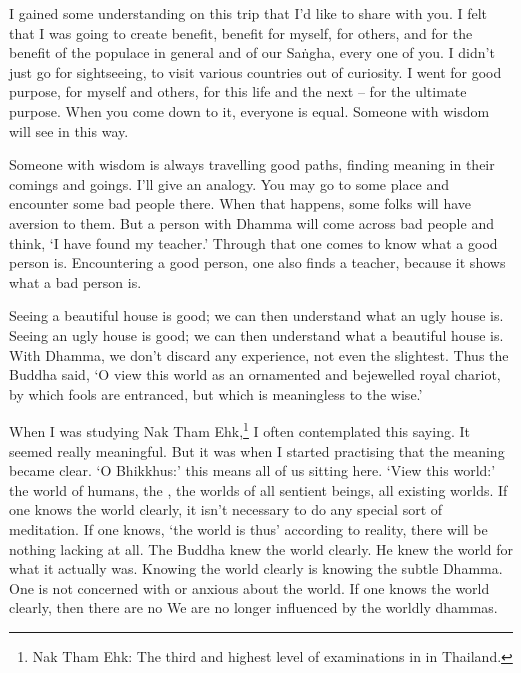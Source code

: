 I gained some understanding on this trip that I'd like to share with you. I felt that I was going to create benefit, benefit for myself, for others, and for the  benefit of the populace in general and of our Sa\.ngha, every one of you. I didn't just go for sightseeing, to visit various countries out of curiosity. I went for good purpose, for myself and others, for this life and the next -- for the ultimate purpose. When you come down to it, everyone is equal. Someone with wisdom will see in this way.

Someone with wisdom is always travelling good paths, finding meaning in their comings and goings. I'll give an analogy. You may go to some place and encounter some bad people there. When that happens, some folks will have aversion to them. But a person with Dhamma will come across bad people and think, `I have found my teacher.' Through that one comes to know what a good person is. Encountering a good person, one also finds a teacher, because it shows what a bad person is.

Seeing a beautiful house is good; we can then understand what an ugly house is. Seeing an ugly house is good; we can then understand what a beautiful house is. With Dhamma, we don't discard any experience, not even the slightest. Thus the Buddha said, `O  view this world as an ornamented and bejewelled royal chariot, by which fools are entranced, but which is meaningless to the wise.'

When I was studying Nak Tham Ehk,\footnote{Nak Tham Ehk: The third and highest level of examinations in  in Thailand.} I often contemplated this saying. It seemed really meaningful. But it was when I started practising that the meaning became clear. `O Bhikkhus:' this means all of us sitting here. `View this world:' the world of humans, the , the worlds of all sentient beings, all existing worlds. If one knows the world clearly, it isn't necessary to do any special sort of meditation. If one knows, `the world is thus' according to reality, there will be nothing lacking at all. The Buddha knew the world clearly. He knew the world for what it actually was. Knowing the world clearly is knowing the subtle Dhamma. One is not concerned with or anxious about the world. If one knows the world clearly, then there are no  We are no longer influenced by the worldly dhammas.

